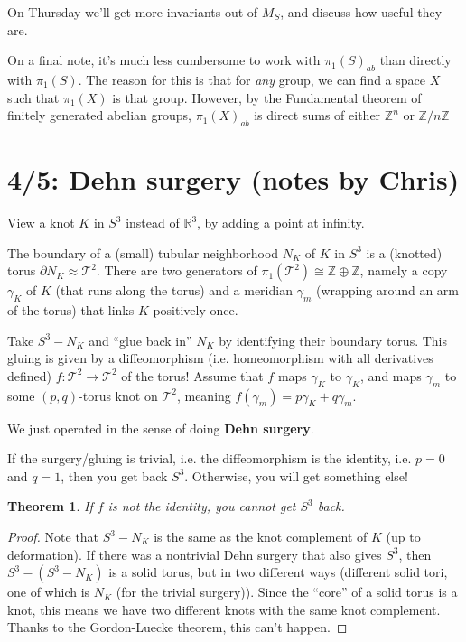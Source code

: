 \documentclass[11pt]{article}
\newcommand{\Z}{\mathbb{Z}}
\newcommand{\R}{\mathbb{R}}
\newcommand{\T}{\mathcal{T}}
\theoremstyle{plain}
\newtheorem{thm}{Theorem}
\theoremstyle{definition}
\begin{document}
On Thursday we'll get more invariants out of $M_S$, and discuss how useful they are.

On a final note, it's much less cumbersome to work with $\pi_1{(S)}_{ab}$ than directly with $\pi_1(S)$. The reason for this is that for \emph{any} group, we can find a space $X$ such that $\pi_1(X)$ is that group. However,
by the Fundamental theorem of finitely generated abelian groups, $\pi_1(X)_{ab}$ is direct sums of either $\Z^n$ or $\Z / n\Z$


\clearpage
\section{4/5: Dehn surgery (notes by Chris)}

View a knot $K$ in $S^3$ instead of $\R^3$, by adding a point at infinity.

The boundary of a (small) tubular neighborhood $N_K$ of $K$ in $S^3$ is a (knotted) torus $\partial N_K\approx\T^2$. There are two generators of $\pi_1(\T^2)\cong\Z\oplus\Z$, namely a copy $\gamma_K$ of $K$ (that runs along the torus) and a meridian $\gamma_m$ (wrapping around an arm of the torus) that links $K$ positively once.

Take $S^3-N_K$ and ``glue back in'' $N_K$ by identifying their boundary torus. This gluing is given by a diffeomorphism (i.e. homeomorphism with all derivatives defined) $f:\T^2\to\T^2$ of the torus! Assume that $f$ maps $\gamma_K$ to $\gamma_K$, and maps $\gamma_m$ to some $(p,q)$-torus knot on $\T^2$, meaning $f(\gamma_m)=p\gamma_K+q\gamma_m$.

\bigskip
We just operated in the sense of doing \textbf{Dehn surgery}.

\bigskip
If the surgery/gluing is trivial, i.e. the diffeomorphism is the identity, i.e. $p=0$ and $q=1$, then you get back $S^3$. Otherwise, you will get something else!

\begin{thm}
If $f$ is not the identity, you cannot get $S^3$ back.
\end{thm}
\begin{proof}
Note that $S^3-N_K$ is the same as the knot complement of $K$ (up to deformation). If there was a nontrivial Dehn surgery that also gives $S^3$, then $S^3-(S^3-N_K)$ is a solid torus, but in two different ways (different solid tori, one of which is $N_K$ (for the trivial surgery)). Since the ``core'' of a solid torus is a knot, this means we have two different knots with the same knot complement. Thanks to the Gordon-Luecke theorem, this can't happen.
\end{proof}
\end{document}
